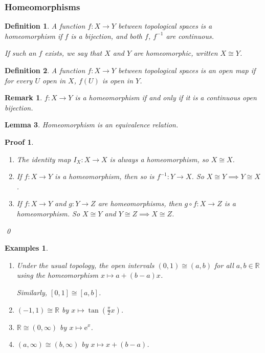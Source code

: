 \documentclass{article}
\theoremstyle{plain}\theoremheaderfont{\normalfont\itshape}\theorembodyfont{\rmfamily}\theoremseparator{.}\newtheorem*{rem}{Remark}\newtheorem*{ex}{Example}\newtheorem*{proof}{Proof}\newtheorem*{altp}{Alternative proof}
\theoremstyle{plain}\theoremheaderfont{\normalfont\bfseries}\theorembodyfont{\rmfamily}\theoremseparator{.}\newtheorem{thm}{Theorem}[section]\newtheorem{lem}[thm]{Lemma}\newtheorem{prop}[thm]{Proposition}\newtheorem*{cor}{Corollary}\newtheorem{defn}[thm]{Definition}\newtheorem{clm}[thm]{Claim}\newtheorem{clminproof}{Claim}
\theoremstyle{break}\theoremheaderfont{\normalfont\itshape}\theorembodyfont{\rmfamily}\theoremseparator{.\medskip}\newtheorem*{proofskip}{Proof}\newtheorem*{exs}{Examples}\newtheorem*{rems}{Remarks}
\theoremstyle{break}\theoremheaderfont{\normalfont\bfseries}\theorembodyfont{\rmfamily}\theoremseparator{.\medskip}\newtheorem{lemskip}[thm]{Lemma}\newtheorem{defnskip}[thm]{Definition}\newtheorem{propskip}[thm]{Proposition}\newtheorem{thmskip}[thm]{Theorem}
\newcommand{\qed}{\hfill\ensuremath{\Box}}
\newcommand{\ee}{\mathrm{e}}
\begin{document}
    \subsubsection{Homeomorphisms}
    \begin{defn}
        A function \(f:X\to Y\) between topological spaces is a \textit{homeomorphism} if \(f\) is a bijection, and both \(f\), \(f^{-1}\) are continuous.

        If such an \(f\) exists, we say that \(X\) and \(Y\) are \textit{homeomorphic}, written \(X\cong Y\).
    \end{defn}

    \begin{defn}
        A function \(f:X\to Y\) between topological spaces is an \textit{open map} if for every \(U\) open in \(X\), \(f(U)\) is open in \(Y\).
    \end{defn}
    \begin{rem}
        \(f:X\to Y\) is a homeomorphism if and only if it is a continuous open bijection.
    \end{rem}

    \begin{lem}
        Homeomorphism is an equivalence relation.
    \end{lem}
    \begin{proofskip}
        \begin{enumerate}[label=(\roman*),topsep=0pt]
            \item The identity map \(I_X:X\to X\) is always a homeomorphism, so \(X\cong X\).
            \item If \(f:X\to Y\) is a homeomorphism, then so is \(f^{-1}:Y\to X\). So \(X\cong Y\implies Y\cong X\).
            \item If \(f:X\to Y\) and \(g:Y\to Z\) are homeomorphisms, then \(g\circ f:X\to Z\) is a homeomorphism. So \(X\cong Y\) and \(Y\cong Z\implies X\cong Z\).
        \end{enumerate}\qed
    \end{proofskip}
    
    \begin{exs}
        \begin{enumerate}[label=(\roman*),topsep=0pt]
            \item Under the usual topology, the open intervals \((0,1)\cong(a,b)\) for all \(a,b\in\mathbb{R}\) using the homeomorphism \(x\mapsto a+(b-a)x\).
            
            Similarly, \([0,1]\cong[a,b]\).
            \item \((-1,1)\cong\mathbb{R}\) by \(x\mapsto\tan(\frac{\pi}{2}x)\).
            \item \(\mathbb{R}\cong(0,\infty)\) by \(x\mapsto \ee^x\).
            \item \((a,\infty)\cong(b,\infty)\) by \(x\mapsto x+(b-a)\).
        \end{enumerate}
    \end{exs}
\end{document}
